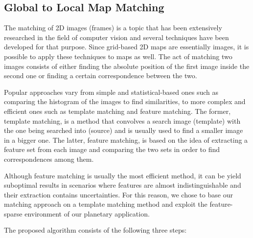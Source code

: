 \subsection{Global to Local Map Matching} \label{map_matching}

The matching of 2D images (frames) is a topic that has been extensively
researched in the field of computer vision and several techniques have
been developed for that purpose.
Since grid-based 2D maps are essentially images, it is possible to
apply these techniques to maps as well.
The act of matching two images consists of either finding the absolute
position of the first image inside the second one or finding a certain
correspondence between the two.

Popular approaches vary from simple and statistical-based ones such as
comparing the histogram of the images to find similarities, to
more complex and efficient ones such as template matching and feature
matching. The former, template matching, is a method that convolves a search
image (template) with the one being searched into (source) and is usually
used to find a smaller image in a bigger one.
The latter, feature matching, is based on the idea of extracting a feature
set from each image and comparing the two sets in order to find
correspondences among them.

Although feature matching is usually the most efficient method,
it can be yield suboptimal results in scenarios where features are
almost indistinguishable and their extraction contains uncertainties.
For this reason, we chose to base our matching approach on a
template matching method and exploit the feature-sparse environment
of our planetary application.

The proposed algorithm consists of the following three steps:


